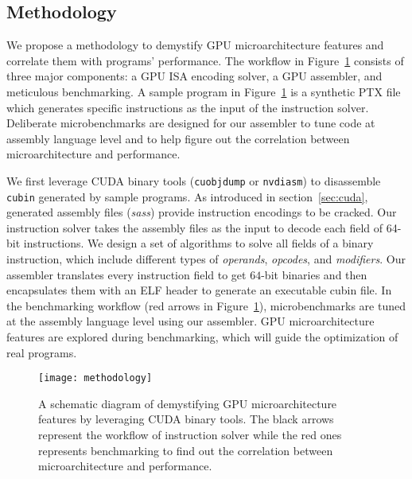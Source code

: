 \subsection{Methodology}


We propose a methodology to demystify GPU microarchitecture features and correlate them with programs' performance.
The workflow in Figure~\ref{fig:workflow} consists of three major components: a GPU ISA encoding solver, a GPU assembler, and meticulous benchmarking.
A sample program in Figure~\ref{fig:workflow} is a synthetic PTX file which generates specific instructions as the input of the instruction solver.
Deliberate microbenchmarks are designed for our assembler to tune code at assembly language level and to help figure out the correlation between microarchitecture and performance.

We first leverage CUDA binary tools ({\tt cuobjdump} or {\tt nvdiasm}) to disassemble {\tt cubin} generated by sample programs. %
As introduced in section~\ref{sec:cuda}, generated assembly files ({\em sass}) provide instruction encodings to be cracked.
Our instruction solver takes the assembly files as the input to decode each field of 64-bit instructions.
We design a set of algorithms to solve all fields of a binary instruction, which include different types of {\em operands}, {\em opcodes}, and {\em modifiers}.
Our assembler translates every instruction field to get $64$-bit binaries and then encapsulates them with an ELF header to generate an executable cubin file.
In the benchmarking workflow (red arrows in Figure~\ref{fig:workflow}), microbenchmarks are tuned at the assembly language level using our assembler.
GPU microarchitecture features are explored during benchmarking, which will guide the optimization of real programs.


\begin{figure}[htbp]
\begin{center}
\texttt{[image: methodology]}
\caption{A schematic diagram of demystifying GPU microarchitecture features by leveraging CUDA binary tools. The black arrows
represent the workflow of instruction solver while the red ones represents benchmarking to find out the correlation between microarchitecture and performance.}
\label{fig:workflow}
\end{center}
\end{figure}
